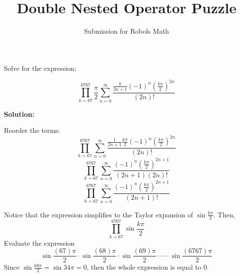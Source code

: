 \documentclass[12pt]{article}
\title{\textbf{Double Nested Operator Puzzle} \\[-0.6em]}
\author{Submission for Robols Math}
\date{}
\begin{document}
\maketitle
\vspace{-2em}

Solve for the expression:

\[ \prod_{k=67}^{6767} \frac{\pi}{2} \sum_{n=0}^{\infty} \frac{\frac {k}{2n+1}(-1)^n (\frac{k\pi}{2})^{2n} }{(2n)!} \]

\textbf{Solution:}

{Reorder the terms:}
\[ \prod_{k=67}^{6767} \sum_{n=0}^{\infty} \frac{\frac {1}{2n+1} \frac{k\pi}{2} (-1)^n (\frac{k\pi}{2})^{2n} }{(2n)!} \]
\[ \prod_{k=67}^{6767} \sum_{n=0}^{\infty} \frac{(-1)^n (\frac{k\pi}{2})^{2n+1} }{(2n+1)(2n)!} \]
\[ \prod_{k=67}^{6767} \sum_{n=0}^{\infty} \frac{(-1)^n (\frac{k\pi}{2})^{2n+1} }{(2n+1)!} \]

{Notice that the expression simplifies to the Taylor expansion of $\sin{\frac{k\pi}{2}}$. Then,}
\[ \prod_{k=67}^{6767} \sin{\frac{k\pi}{2}} \]
{Evaluate the expression}
\[\sin{\frac{(67)\pi}{2}} \cdot \sin{\frac{(68)\pi}{2}} \cdot \sin{\frac{(69)\pi}{2}} \cdot \cdots \cdot \sin{\frac{(6767)\pi}{2}}\]
{Since $\sin{\frac{68\pi}{2}}=\sin{34\pi}=0$, then the whole expression is equal to 0}.
\end{document}
